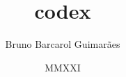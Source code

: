 



\usepackage{anyfontsize}
\usepackage{float}
\usepackage{subcaption}
\usepackage{wrapfig}

\title{codex}
\author{Bruno Barcarol Guimarães}
\date{MMXXI}


    \frontmatter
    
    \tableofcontents
    \mainmatter
    
    \cleardoublepage
    \listoffigures
    \cleardoublepage
    \listoftables
    \cleardoublepage
    \lstlistoflistings
    \printbibliography

